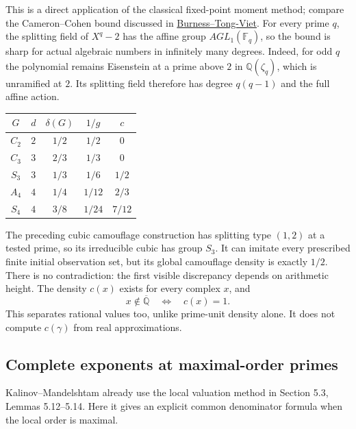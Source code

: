 \documentclass[11pt,a4paper]{article}
\theoremstyle{definition}
\theoremstyle{remark}
\theoremstyle{plain}
\numberwithin{equation}{section}
\def\operatorname#1{#1}\def\mathrm#1{#1}}
\begin{document}
This is a direct application of the classical fixed-point moment
method; compare the Cameron--Cohen bound discussed in
\href{https://arxiv.org/abs/1403.7666}{Burness--Tong-Viet}.
For every prime $q$, the splitting field of $X^q-2$ has the affine
group $\operatorname{AGL}_1(\mathbb F_q)$, so the bound is sharp
for actual algebraic numbers in infinitely many degrees.  Indeed,
for odd $q$ the polynomial remains Eisenstein at a prime above $2$
in $\mathbb Q(\zeta_q)$, which is unramified at $2$.  Its splitting
field therefore has degree $q(q-1)$ and the full affine action.

\begin{center}
\begin{tabular}{c|c|c|c|c}
$G$ & $d$ & $\delta(G)$ & $1/g$ & $c$\\\hline
$C_2$ & $2$ & $1/2$ & $1/2$ & $0$\\
$C_3$ & $3$ & $2/3$ & $1/3$ & $0$\\
$S_3$ & $3$ & $1/3$ & $1/6$ & $1/2$\\
$A_4$ & $4$ & $1/4$ & $1/12$ & $2/3$\\
$S_4$ & $4$ & $3/8$ & $1/24$ & $7/12$
\end{tabular}
\end{center}

The preceding cubic camouflage construction has splitting type
$(1,2)$ at a tested prime, so its irreducible cubic has group $S_3$.
It can imitate every prescribed finite initial observation set,
but its global camouflage density is exactly $1/2$.  There is no
contradiction: the first visible discrepancy depends on arithmetic
height.  The density $c(x)$ exists for every complex $x$, and
\[
 x\notin\overline{\mathbb Q}\quad\Longleftrightarrow\quad c(x)=1.
\]
This separates rational values too, unlike prime-unit density alone.
It does not compute $c(\gamma)$ from real approximations.

\subsection{Complete exponents at maximal-order primes}

Kalinov--Mandelshtam already use the local valuation method in
Section 5.3, Lemmas 5.12--5.14.  Here it gives an explicit common
denominator formula when the local order is maximal.
\end{document}
